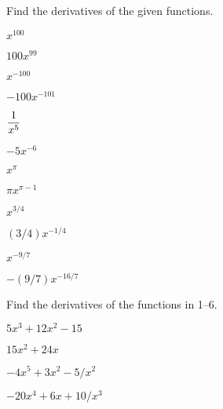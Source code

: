 \begin{exercises}

Find the derivatives of the given functions.

\twocol

\begin{exercise} $x^{100}$
\begin{answer} $100x^{99}$
\end{answer}\end{exercise}

\begin{exercise} $x^{-100}$
\begin{answer} $-100x^{-101}$
\end{answer}\end{exercise}

\begin{exercise} $\displaystyle {1\over x^5}$
\begin{answer} $-5x^{-6}$
\end{answer}\end{exercise}

\begin{exercise} $x^\pi$
\begin{answer} $\pi x^{\pi-1}$
\end{answer}\end{exercise}

\begin{exercise} $x^{3/4}$
\begin{answer} $(3/4)x^{-1/4}$
\end{answer}\end{exercise}

\begin{exercise} $x^{-9/7}$
\begin{answer} $-(9/7)x^{-16/7}$
\end{answer}\end{exercise}

\endtwocol

Find the derivatives of the functions in 1--6.

\begin{exercise} $5x^3+12x^2-15$
\begin{answer} $15x^2+24x$
\end{answer}\end{exercise}

\begin{exercise} $-4x^5 + 3x^2 - 5/x^2$
\begin{answer} $-20x^4+6x+10/x^3$
\end{answer}\end{exercise}


\end{exercises}
